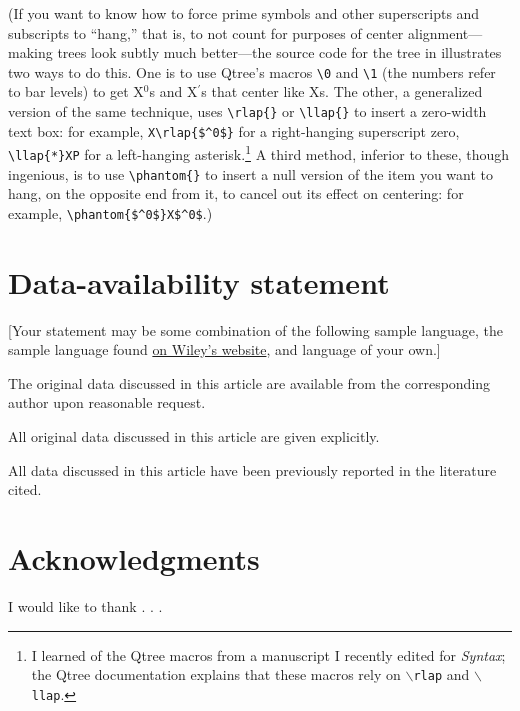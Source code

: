 \documentclass[letterpaper,12pt, twoside]{article}
\begin{document}
(If you want to know how to force prime symbols and other superscripts and subscripts to ``hang,'' that is, to not count for purposes of center alignment---making trees look subtly much better---the source code for the tree in \Last illustrates two ways to do this. One is to use Qtree's macros \verb|\0| and \verb|\1| (the numbers refer to bar levels) to get X$^0$s and X$^\prime$s that center like Xs. The other, a generalized version of the same technique, uses \verb|\rlap{}| or \verb|\llap{}| to insert a zero-width text box: for example, \verb|X\rlap{$^0$}| for a right-hanging superscript zero, \verb|\llap{*}XP| for a left-hanging asterisk.\footnote{I learned of the Qtree macros from a manuscript I recently edited for \emph{Syntax}; the Qtree documentation explains that these macros rely on \texttt{$\backslash$rlap} and \texttt{$\backslash$llap}.} A third method, inferior to these, though ingenious, is to use \verb|\phantom{}| to insert a null version of the item you want to hang, on the opposite end from it, to cancel out its effect on centering: for example, \verb|\phantom{$^0$}X$^0$|.)









\section*{Data-availability statement}
\label{sec:datastatement}
[Your statement may be some combination of the following sample language, the sample language found \href{https://authorservices.wiley.com/author-resources/Journal-Authors/open-access/data-sharing-citation/data-sharing-policy.html}{on Wiley's website}, and language of your own.] 

The original data discussed in this article are available from the corresponding author upon reasonable request. 

All original data discussed in this article are given explicitly. 

All data discussed in this article have been previously reported in the literature cited.


\section*{Acknowledgments}
\label{sec:ack}
I would like to thank . . .
\end{document}
